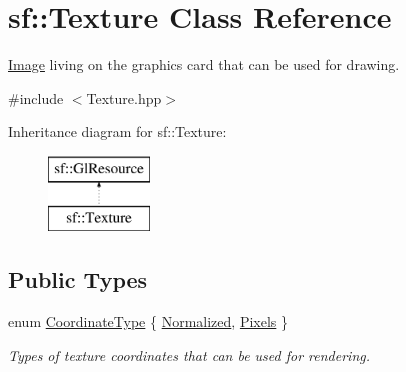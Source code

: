 \hypertarget{classsf_1_1_texture}{}\section{sf\+:\+:Texture Class Reference}
\label{classsf_1_1_texture}


\hyperlink{classsf_1_1_image}{Image} living on the graphics card that can be used for drawing.  




{\ttfamily \#include $<$Texture.\+hpp$>$}

Inheritance diagram for sf\+:\+:Texture\+:\begin{figure}[H]
\begin{center}
\leavevmode
\includegraphics[height=2.000000cm]{classsf_1_1_texture}
\end{center}
\end{figure}
\subsection*{Public Types}
\begin{DoxyCompactItemize}
\item 
enum \hyperlink{classsf_1_1_texture_aa6fd3bbe3c334b3c4428edfb2765a82e}{Coordinate\+Type} \{ \hyperlink{classsf_1_1_texture_aa6fd3bbe3c334b3c4428edfb2765a82ea69d6228950882e4d68be4ba4dbe7df73}{Normalized}, 
\hyperlink{classsf_1_1_texture_aa6fd3bbe3c334b3c4428edfb2765a82ea6372f9c3a10203a7a69d8d5da59d82ff}{Pixels}
 \}\begin{DoxyCompactList}\small\item\em Types of texture coordinates that can be used for rendering. \end{DoxyCompactList}
\end{DoxyCompactItemize}
